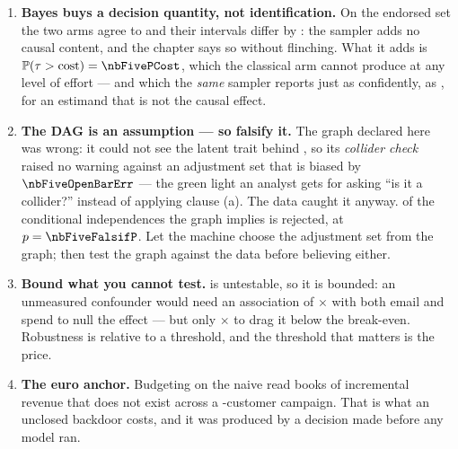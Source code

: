 \begin{enumerate}[leftmargin=*, itemsep=.45em]
  \item \textbf{Bayes buys a decision quantity, not identification.} On the endorsed set the two
        arms agree to \eur{\nbFiveArmGap} and their intervals differ by \eur{\nbFiveArmWidthGap}:
        the sampler adds no causal content, and the chapter says so without flinching. What it
        adds is $\Prob(\tau > \text{cost}) = \nbFivePCost$, which the classical arm cannot produce
        at any level of effort --- and which the \emph{same} sampler reports just as confidently,
        as \nbFivePCostKs, for an estimand that is not the causal effect.

  \item \textbf{The DAG is an assumption --- so falsify it.} The graph declared here was wrong: it
        could not see the latent trait behind , so its \emph{collider check}
        raised no warning against an adjustment set that is biased by $\nbFiveOpenBarErr$ --- the
        green light an analyst gets for asking ``is it a collider?'' instead of applying clause (a).
        The data caught it anyway.
        \nbFiveFalsifNViolations{} of the \nbFiveFalsifNTests{} conditional independences the
        graph implies is rejected, at $p = \nbFiveFalsifP$. Let the machine choose the adjustment
        set from the graph; then test the graph against the data before believing either.

  \item \textbf{Bound what you cannot test.}  is untestable, so it is
        bounded: an unmeasured confounder would need an association of \nbFiveEValue$\times$ with
        both email and spend to null the effect --- but only \nbFiveEValueBe$\times$ to drag it
        below the \eur{\nbFiveCost} break-even. Robustness is relative to a threshold, and the
        threshold that matters is the price.

  \item \textbf{The euro anchor.} Budgeting on the naive read books \eur{\nbFivePhantom} of
        incremental revenue that does not exist across a \nbFiveCampaignN-customer campaign. That
        is what an unclosed backdoor costs, and it was produced by a decision made before any model
        ran.
\end{enumerate}

